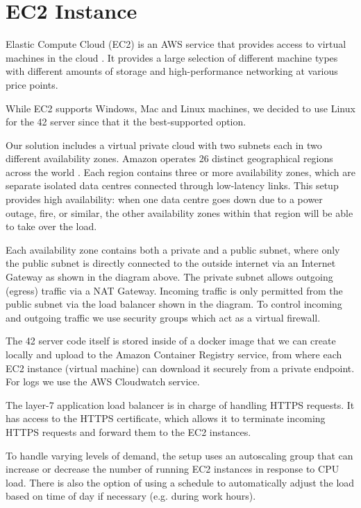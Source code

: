 \section{EC2 Instance}

Elastic Compute Cloud (EC2) is an AWS service that provides access to virtual machines in the cloud \cite{amazon-2022C}. It provides a large selection of different machine types with different amounts of storage and high-performance networking at various price points.

While EC2 supports Windows, Mac and Linux machines, we decided to use Linux for the 42 server since that it the best-supported option.


Our solution includes a virtual private cloud with two subnets each in two different availability zones. Amazon operates 26 distinct geographical regions across the world \cite{amazon-2022D}. Each region contains three or more availability zones, which are separate isolated data centres connected through low-latency links. This setup provides high availability: when one data centre goes down due to a power outage, fire, or similar, the other availability zones within that region will be able to take over the load.

Each availability zone contains both a private and a public subnet, where only the public subnet is directly connected to the outside internet via an Internet Gateway as shown in the diagram above. The private subnet allows outgoing (egress) traffic via a NAT Gateway. Incoming traffic is only permitted from the public subnet via the load balancer shown in the diagram. To control incoming and outgoing traffic we use security groups which act as a virtual firewall.

The 42 server code itself is stored inside of a docker image that we can create locally and upload to the Amazon Container Registry service, from where each EC2 instance (virtual machine) can download it securely from a private endpoint. For logs we use the AWS Cloudwatch service.

The layer-7 application load balancer is in charge of handling HTTPS requests. It has access to the HTTPS certificate, which allows it to terminate incoming HTTPS requests and forward them to the EC2 instances.

To handle varying levels of demand, the setup uses an autoscaling group that can increase or decrease the number of running EC2 instances in response to CPU load. There is also the option of using a schedule to automatically adjust the load based on time of day if necessary (e.g. during work hours).

